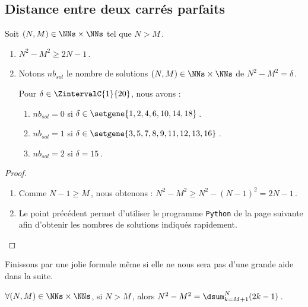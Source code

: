 

\subsection{Distance entre deux carrés parfaits}

\begin{fact} \label{diff-square-ko}
	Soit $(N, M) \in \NNs \times \NNs$ tel que $N > M$\,.
	\begin{enumerate}
		\item $N^2 - M^2 \geq 2N - 1$\,.
		
		\item Notons $nb_{sol}$ le nombre de solutions $(N, M) \in \NNs \times \NNs$ de $N^2 - M^2 = \delta$\,.
		
		\smallskip
		\noindent
		Pour $\delta \in \ZintervalC{1}{20}$, nous avons :
		\begin{enumerate}
			\item $nb_{sol}= 0$ si $\delta \in \setgene{1, 2, 4, 6, 10, 14, 18}$\,.

			\item $nb_{sol}= 1$ si $\delta \in \setgene{3, 5, 7, 8, 9, 11, 12, 13, 16}$\,.

			\item $nb_{sol}= 2$ si $\delta = 15$\,.
		\end{enumerate}
	\end{enumerate}
\end{fact}


\begin{proof}
	\leavevmode
	
	\vspace{-1ex}
	\begin{enumerate}
		\item Comme $N - 1 \geq M$\,, nous obtenons :
		$N^2 - M^2 \geq N^2 - (N - 1)^2 = 2N - 1$\,.

		\item Le point précédent permet d'utiliser le programme \verb#Python# de la page suivante afin d'obtenir les nombres de solutions indiqués rapidement.
		\qedhere
	\end{enumerate}
\end{proof}

	


Finissons par une jolie formule même si elle ne nous sera pas d'une grande aide dans la suite.


\begin{fact} \label{dist-square}
	$\forall (N, M) \in \NNs \times \NNs$, 
	si $N > M$\,, alors $N^2 - M^2 = \dsum_{k=M+1}^{N} (2 k - 1)$\,.
\end{fact}



